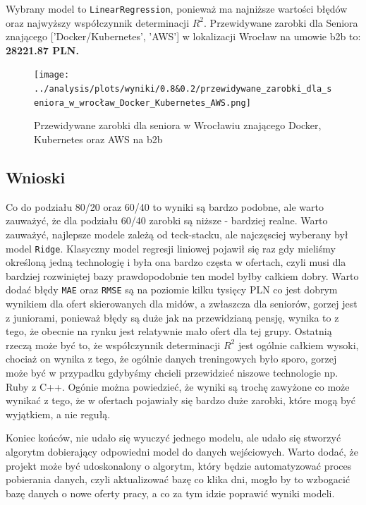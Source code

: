 \documentclass[a4paper]{article}
\begin{document}
Wybrany model to \texttt{LinearRegression}, ponieważ ma najniższe wartości błędów oraz najwyższy współczynnik determinacji $R^2$.
Przewidywane zarobki dla Seniora znającego ['Docker/Kubernetes', 'AWS'] w lokalizacji Wrocław na umowie b2b to: \textbf{28221.87 PLN.}
\begin{figure}[H]
    \centering
    \texttt{[image: ../analysis/plots/wyniki/0.8\&0.2/przewidywane\_zarobki\_dla\_seniora\_w\_wrocław\_Docker\_Kubernetes\_AWS.png]}
    \caption{Przewidywane zarobki dla seniora w Wrocławiu znającego Docker, Kubernetes oraz AWS na b2b}
\end{figure}

\newpage

\subsection{Wnioski}

\quad Co do podziału 80/20 oraz 60/40 to wyniki są bardzo podobne, ale warto zauważyć, że dla podziału 60/40 zarobki są niższe - bardziej realne.
Warto zauważyć, najlepsze modele zależą od teck-stacku, ale najczęsciej wyberany był model \texttt{Ridge}.
Klasyczny model regresji liniowej pojawił się raz gdy mieliśmy określoną jedną technologię i była ona bardzo częsta w ofertach, czyli
musi dla bardziej rozwiniętej bazy prawdopodobnie ten model byłby całkiem dobry. Warto dodać błędy \texttt{MAE} oraz \texttt{RMSE} są na poziomie kilku tysięcy PLN
co jest dobrym wynikiem dla ofert skierowanych dla midów, a zwłaszcza dla seniorów, gorzej jest z juniorami, ponieważ błędy są duże jak na przewidzianą pensję,
wynika to z tego, że obecnie na rynku jest relatywnie mało ofert dla tej grupy. Ostatnią rzeczą może być to, że współczynnik determinacji $R^2$ jest ogólnie całkiem wysoki,
chociaż on wynika z tego, że ogólnie danych treningowych było sporo, gorzej może być w przypadku gdybyśmy chcieli przewidzieć niszowe technologie np. Ruby z C++.
Ogónie można powiedzieć, że wyniki są trochę zawyżone co może wynikać z tego, że w ofertach pojawiały się
bardzo duże zarobki, które mogą być wyjątkiem, a nie regułą.

\quad Koniec końców, nie udało się wyuczyć jednego modelu, ale udało się stworzyć algorytm dobierający odpowiedni model do danych wejściowych.
Warto dodać, że projekt może być udoskonalony o algorytm, który będzie automatyzować proces pobierania danych, czyli aktualizować bazę co klika dni,
mogło by to wzbogacić bazę danych o nowe oferty pracy, a co za tym idzie poprawić wyniki modeli.
\end{document}
